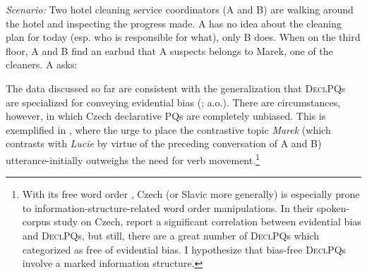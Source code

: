 \documentclass[output=paper,colorlinks,citecolor=brown]{langscibook}
\begin{document}
\eanoraggedright \textit{Scenario:} Two hotel cleaning service coordinators (A and B) are walking around the hotel and inspecting the progress made. A has no idea about the cleaning plan for today (esp. who is responsible for what), only B does. When on the third floor, A and B find an earbud that A suspects belongs to Marek, one of the cleaners. A asks:\label{sim:ex:bias4}
\z\z

\noindent The data discussed so far are consistent with the generalization that \textsc{DeclPQ}s are specialized for conveying evidential bias (\citealt{Buring.Gunlogson2000,Gunlogson2002}; a.o.). There are circumstances, however, in which Czech declarative PQs are completely unbiased. This is exemplified in , where the urge to place the contrastive topic \textit{Marek} (which contrasts with \textit{Lucie} by virtue of the preceding conversation of A and B) utterance-initially outweighs the need for verb movement.\footnote{With its free word order \citep{jasinsimik}, Czech (or Slavic more generally) is especially prone to information-structure-related word order manipulations. In their spoken-corpus study on Czech, \citet{Onoeva.Stankova2025} report a significant correlation between evidential bias and \textsc{DeclPQ}s, but still, there are a great number of \textsc{DeclPQ}s which \citet{Onoeva.Stankova2025} categorized as free of evidential bias. I hypothesize that bias-free \textsc{DeclPQ}s involve a marked information structure.}
\end{document}
